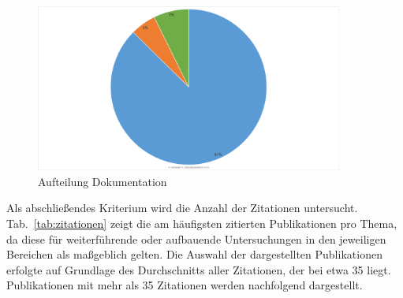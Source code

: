 \begin{figure}[!htbp]
    \centering
    \caption{Aufteilung Dokumentation}
    \label{fig:16-dokumentation}
    \includegraphics[width=0.90\textwidth]{graphics/16-dokumentation3.png}
\end{figure}

Als abschließendes Kriterium wird die Anzahl der Zitationen untersucht. Tab.~\ref{tab:zitationen} zeigt die am häufigsten zitierten Publikationen pro Thema, da diese für weiterführende oder aufbauende Untersuchungen in den jeweiligen Bereichen als maßgeblich gelten. Die Auswahl der dargestellten Publikationen erfolgte auf Grundlage des Durchschnitts aller Zitationen, der bei etwa 35 liegt. Publikationen mit mehr als 35 Zitationen werden nachfolgend dargestellt.

